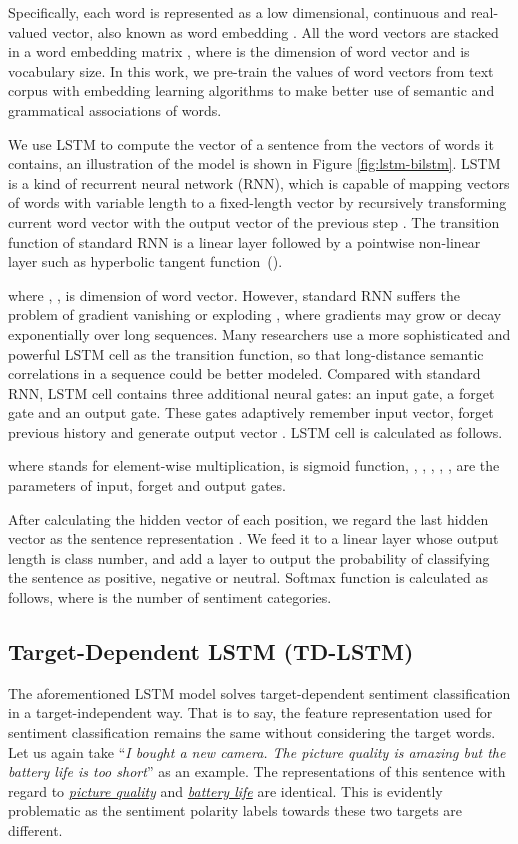 \documentclass[11pt]{article}
\begin{document}
Specifically, each word is represented as a low dimensional, continuous and real-valued vector, also known as word embedding \cite{Bengio2003,Mikolov2013a,Pennington2014,Tang2014}.
All the word vectors are stacked in a word embedding matrix , where  is the dimension of word vector and  is vocabulary size.
In this work, we pre-train the values of word vectors from text corpus with embedding learning algorithms \cite{Pennington2014,Tang2014} to make better use of semantic and grammatical associations of words. 


We use LSTM to compute the vector of a sentence from the vectors of words it contains, an illustration of the model is shown in Figure \ref{fig:lstm-bilstm}. LSTM is a kind of recurrent neural network (RNN), which is capable of mapping vectors of words with variable length to a fixed-length vector by recursively transforming current word vector  with the output vector of the previous step . 
The transition function of standard RNN is a linear layer followed by a pointwise non-linear layer such as hyperbolic tangent function~().

where , ,  is dimension of word vector. 
However, standard RNN suffers the problem of gradient vanishing or exploding \cite{Bengio1994,Hochreiter1997}, where gradients may grow or decay exponentially over long sequences.
Many researchers use a more sophisticated and powerful LSTM cell as the transition function, so that long-distance semantic correlations in a sequence could be better modeled. 
Compared with standard RNN, LSTM cell contains three additional neural gates: an input gate, a forget gate and an output gate. 
These gates adaptively remember input vector, forget previous history and generate output vector \cite{Hochreiter1997}. LSTM cell is calculated as follows.

where  stands for element-wise multiplication,  is sigmoid function, , , , , ,  are the parameters of input, forget and output gates. 


After calculating the hidden vector of each position, we regard the last hidden vector as the sentence representation \cite{Li2015a,Tang2015}.
We feed it to a linear layer whose output length is class number, and add a  layer to output the probability of classifying the sentence as positive, negative or neutral. 
Softmax function is calculated as follows, where  is the number of sentiment categories. 


\subsection{Target-Dependent LSTM (TD-LSTM)}
The aforementioned LSTM model solves target-dependent sentiment classification in a target-independent way. 
That is to say, the feature representation used for sentiment classification remains the same without considering the target words. 
Let us again take ``\textit{I bought a new camera. The {picture quality} is amazing but the {battery life} is too short}'' as an example.
The representations of this sentence with regard to \textit{\underline{picture quality}} and \textit{\underline{battery life}} are identical. This is evidently problematic as the sentiment polarity labels towards these two targets are different.
\end{document}
